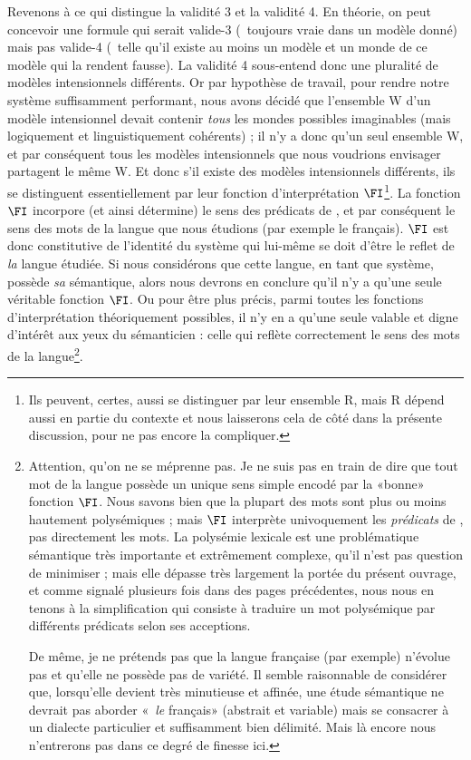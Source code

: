 Revenons à ce qui distingue la validité 3 et la validité 4.
En théorie, on peut concevoir une formule qui serait valide-3 (\ie\ toujours vraie dans un modèle donné) mais pas valide-4 (\ie\ telle qu'il existe au moins un modèle et un monde de ce modèle qui la rendent fausse).  
La validité 4 sous-entend donc une pluralité de modèles intensionnels différents. 
Or par hypothèse de travail, pour rendre notre système suffisamment performant, nous avons décidé que l'ensemble \Unv W d'un modèle intensionnel devait contenir \emph{tous} les mondes possibles imaginables (mais logiquement et linguistiquement cohérents) ; il n'y a donc qu'un seul ensemble \Unv W, et par conséquent tous les modèles intensionnels que nous voudrions envisager partagent le même \Unv W.  Et donc s'il existe des modèles intensionnels différents, ils se distinguent essentiellement par leur fonction d'interprétation $\FI$\footnote{Ils peuvent, certes, aussi se distinguer par leur ensemble \Unv R, mais \Unv R dépend aussi en partie du contexte et nous laisserons cela de côté dans la présente discussion, pour ne pas encore la compliquer.}.
La fonction $\FI$ incorpore (et ainsi détermine) le sens des prédicats de {\LO}, et par conséquent le sens des mots de la langue que nous étudions (par exemple le français).  $\FI$ est donc constitutive de l'identité du système {\LO} qui lui-même se doit d'être le reflet de \emph{la} langue étudiée.
Si nous considérons que cette langue, en tant que système, possède \emph{sa} sémantique, alors nous devrons en conclure qu'il n'y a qu'une seule véritable fonction $\FI$. Ou pour être plus précis, parmi toutes les fonctions d'interprétation théoriquement possibles, il n'y en a qu'une seule valable et digne d'intérêt aux yeux du sémanticien : celle qui reflète correctement le sens des mots de la langue\footnote{Attention, qu'on ne se méprenne pas. Je ne suis pas en train de dire que tout mot de la langue possède un unique sens simple encodé par la «bonne» fonction $\FI$.  Nous savons bien que la plupart des mots sont plus ou moins hautement polysémiques ; mais $\FI$ interprète univoquement les \emph{prédicats} de {\LO}, pas directement les mots.  La polysémie lexicale est une problématique sémantique très importante et extrêmement complexe, qu'il n'est pas question de minimiser ; mais elle dépasse très largement la portée du présent ouvrage, et comme signalé plusieurs fois dans des pages précédentes, nous nous en tenons à la simplification qui consiste à traduire un mot polysémique par différents prédicats selon ses acceptions.

De même, je ne prétends pas que la langue française (par exemple) n'évolue pas et qu'elle ne possède pas de variété.  Il semble raisonnable de considérer que, lorsqu'elle devient très minutieuse et affinée, une étude sémantique ne devrait pas aborder «~\emph{le} français» (abstrait et variable) mais se consacrer à un dialecte particulier et suffisamment bien délimité. Mais là encore nous n'entrerons pas dans ce degré de finesse ici.}. 
